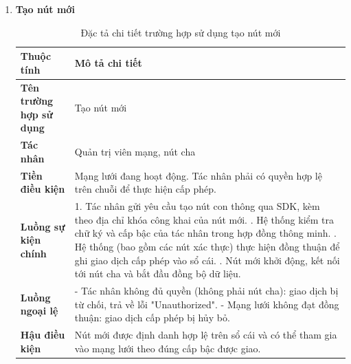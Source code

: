 \documentclass[12pt,a4paper]{article}
\begin{document}
\begin{enumerate}[label=\textbf{\alph*)}]
    \item \textbf{Tạo nút mới}
    \begin{table}[H]
        \centering
        \renewcommand{\arraystretch}{1.4} %
        \begin{tabularx}{\textwidth}{|p{3.5cm}|X|}
            \hline
            \textbf{Thuộc tính} & \textbf{Mô tả chi tiết} \\ \hline
            \textbf{Tên trường hợp sử dụng} & Tạo nút mới \\ \hline
            \textbf{Tác nhân} & Quản trị viên mạng, nút cha\\ \hline
            \textbf{Tiền điều kiện} & Mạng lưới đang hoạt động. Tác nhân phải có quyền hợp lệ trên chuỗi để thực hiện cấp phép. \\ \hline
            \textbf{Luồng sự kiện chính} & 
            1. Tác nhân gửi yêu cầu tạo nút con thông qua SDK, kèm theo địa chỉ khóa công khai của nút mới. \newline
            2. Hệ thống kiểm tra chữ ký và cấp bậc của tác nhân trong hợp đồng thông minh. \newline
            3. Hệ thống (bao gồm các nút xác thực) thực hiện đồng thuận để ghi giao dịch cấp phép vào sổ cái. \newline
            4. Nút mới khởi động, kết nối tới nút cha và bắt đầu đồng bộ dữ liệu. \\ \hline
            \textbf{Luồng ngoại lệ} & 
            - Tác nhân không đủ quyền (không phải nút cha): giao dịch bị từ chối, trả về lỗi "Unauthorized". \newline
            - Mạng lưới không đạt đồng thuận: giao dịch cấp phép bị hủy bỏ. \\ \hline
            \textbf{Hậu điều kiện} & Nút mới được định danh hợp lệ trên sổ cái và có thể tham gia vào mạng lưới theo đúng cấp bậc được giao. \\ \hline
        \end{tabularx}
        \caption{Đặc tả chi tiết trường hợp sử dụng tạo nút mới}
        \label{tab:dac_ta_tao_node_moi}
    \end{table}

    \newpage


\end{enumerate}
\end{document}
